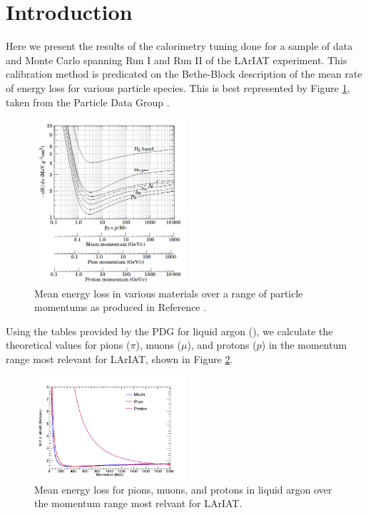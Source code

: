 \section{Introduction}\label{sec:Introduction}

Here we present the results of the calorimetry tuning done for a sample of data and Monte Carlo spanning Run I and Run II of the LArIAT experiment. This calibration method is predicated on the Bethe-Block description of the mean rate of energy loss for various particle species. This is best represented by Figure \ref{fig:PDGEnergyLoss}, taken from the Particle Data Group \cite{PDG}.

\begin{figure}[htb]
\centering
\includegraphics[width=0.50\textwidth]{images/PDGdEdX.png}
\caption{Mean energy loss in various materials over a range of particle momentums as produced in Reference \cite{PDG}.}
\label{fig:PDGEnergyLoss}
\end{figure}

Using the tables provided by the PDG for liquid argon (\cite{PDG-Argon}), we calculate the theoretical values for pions ($\pi$), muons ($\mu$), and protons ($p$) in the momentum range most relevant for LArIAT, shown in Figure \ref{fig:PDGEnergyLossArgon}.

\begin{figure}[htb]
\centering
\includegraphics[width=0.50\textwidth]{images/dEdXvsMomentumTemplate}
\caption{Mean energy loss for pions, muons, and protons in liquid argon over the momentum range most relvant for LArIAT.}
\label{fig:PDGEnergyLossArgon}
\end{figure}

